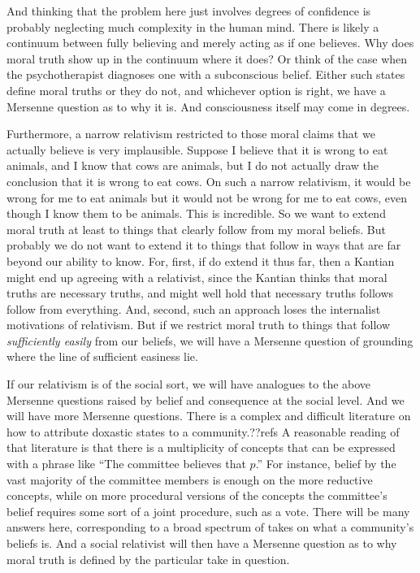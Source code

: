 And thinking that the problem here just involves degrees of confidence is probably neglecting much complexity in the human
mind. There is likely a continuum between fully believing and merely acting as if one believes. Why does moral truth show up
in the continuum where it does? Or think of the case when the psychotherapist diagnoses one with a subconscious belief.
Either such states define moral truths or they do not, and whichever option is right, we have a Mersenne question as to why it is. And consciousness
itself may come in degrees.

Furthermore, a narrow relativism restricted to those moral claims that we actually believe is very implausible. Suppose I believe that it is wrong
to eat animals, and I know that cows are animals, but I do not actually draw the conclusion that it is wrong to eat cows.
On such a narrow relativism, it would be wrong for me to eat animals but it would not be wrong for me to eat cows, even though
I know them to be animals. This is incredible. So we want to extend moral truth at least to things that clearly follow from my moral beliefs.
But probably we do not want to extend it to things that follow in ways that are far beyond our ability to know. For, first,
if do extend it thus far, then a Kantian might end up agreeing with a relativist, since the Kantian thinks that moral truths are
necessary truths, and might well hold that necessary truths follows follow from everything. And, second, such an
approach loses the 
internalist motivations of relativism. But if we restrict moral truth to things that follow \textit{sufficiently easily} from
our beliefs, we will have a Mersenne question of grounding where the line of sufficient easiness lie.

If our relativism is of the social sort, we will have analogues to the above Mersenne questions raised by belief and consequence at the social level.  And we 
will have more Mersenne questions. There is a complex and difficult literature on how to attribute doxastic states to a community.??refs A reasonable
reading of that literature is that there is a multiplicity of concepts that can be expressed with a phrase like ``The committee believes 
that $p$.'' For instance, belief by the vast majority of the committee members is enough on the more reductive concepts, 
while on more procedural versions of the concepts the committee's belief requires some sort of a joint procedure, such as a vote. 
There will be many answers here, corresponding to a broad spectrum of takes on what a community's beliefs is. And a social relativist
will then have a Mersenne question as to why moral truth is defined by the particular take in question.

